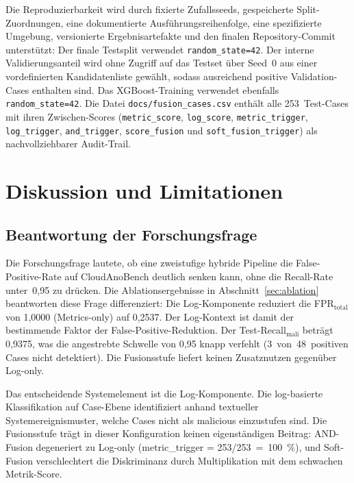 Die Reproduzierbarkeit wird durch fixierte Zu\-falls\-seeds, gespeicherte Split-Zu\-ord\-nun\-gen,
eine dokumentierte Ausführungsreihenfolge, eine spezifizierte Umgebung, versionierte
Ergebnisartefakte und den finalen Repository-Commit unterstützt: Der finale Testsplit
verwendet \texttt{random\_state=42}. Der interne Validierungsanteil wird ohne Zugriff
auf das Testset über Seed~0 aus einer vordefinierten Kandidatenliste gewählt, sodass
ausreichend positive Validation-Cases enthalten sind. Das XGBoost-Training verwendet
ebenfalls \texttt{random\_state=42}. Die Datei \texttt{docs/fusion\_cases.csv} enthält
alle 253~Test-Cases mit ihren Zwischen-Scores (\texttt{metric\_score},
\texttt{log\_score}, \texttt{metric\_trigger}, \texttt{log\_trigger},
\texttt{and\_trigger}, \texttt{score\_fusion} und \texttt{soft\_fusion\_trigger}) als
nachvollziehbarer Audit-Trail.

\section{Diskussion und Limitationen}

\subsection{Beantwortung der Forschungsfrage}

Die Forschungsfrage lautete, ob eine zweistufige hybride Pipeline die False-Positive-Rate auf CloudAnoBench deutlich senken kann, ohne die Recall-Rate unter~0{,}95 zu drücken. Die Ablationsergebnisse in Abschnitt~\ref{sec:ablation} beantworten diese Frage differenziert: Die Log-Komponente reduziert die FPR$_{\text{total}}$ von 1{,}0000 (Metrics-only) auf 0{,}2537. Der Log-Kontext ist damit der bestimmende Faktor der False-Positive-Reduktion. Der Test-Recall$_{\text{mali}}$ beträgt 0{,}9375, was die angestrebte Schwelle von 0{,}95 knapp verfehlt (3~von~48~positiven Cases nicht detektiert). Die Fusionsstufe liefert keinen Zusatznutzen gegenüber Log-only.

Das entscheidende Systemelement ist die Log-Komponente. Die log-basierte Klassifikation auf Case-Ebene identifiziert anhand textueller Systemereignismuster, welche Cases nicht als malicious einzustufen sind. Die Fusionsstufe trägt in dieser Konfiguration keinen eigenständigen Beitrag: AND-Fusion degeneriert zu Log-only (metric\_trigger = 253/253~=~100~\%), und Soft-Fusion verschlechtert die Diskriminanz durch Multiplika\-tion mit dem schwachen Metrik-Score.

